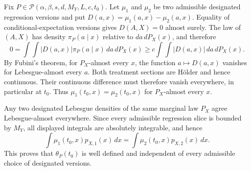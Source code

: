 Fix \(P\in\mathcal P(\alpha,\beta,s,d,M_Y,L,c,t_0)\). Let \(\mu_1\) and \(\mu_2\) be two admissible designated regression versions and put \(D(a,x)=\mu_1(a,x)-\mu_2(a,x)\). Equality of conditional-expectation versions gives \(D(A,X)=0\) almost surely. The law of \((A,X)\) has density \(\pi_P(a\mid x)\) relative to \(da\,dP_X(x)\), and therefore
\[
0=\int\!\int \lvert D(a,x)\rvert\pi_P(a\mid x)\,da\,dP_X(x)
\ge c\int\!\int \lvert D(a,x)\rvert\,da\,dP_X(x).
\]
By Fubini's theorem, for \(P_X\)-almost every \(x\), the function \(a\mapsto D(a,x)\) vanishes for Lebesgue-almost every \(a\). Both treatment sections are Hölder and hence continuous. Their continuous difference must therefore vanish everywhere, in particular at \(t_0\). Thus \(\mu_1(t_0,x)=\mu_2(t_0,x)\) for \(P_X\)-almost every \(x\).

Any two designated Lebesgue densities of the same marginal law \(P_X\) agree Lebesgue-almost everywhere. Since every admissible regression slice is bounded by \(M_Y\), all displayed integrals are absolutely integrable, and hence
\[
\int\mu_1(t_0,x)p_{X,1}(x)\,dx
=
\int\mu_2(t_0,x)p_{X,2}(x)\,dx.
\]
This proves that \(\theta_P(t_0)\) is well defined and independent of every admissible choice of designated versions.